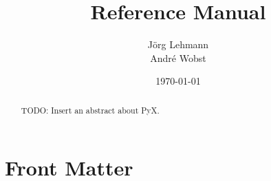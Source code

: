 \documentclass{manual}
\title{\PyX{} Reference Manual}
\author{J\"org Lehmann\\
Andr\'e Wobst}
\date{\today}
\def\PyX{PyX}
\begin{document}
\maketitle

\ifhtml %
\chapter*{Front Matter\label{front}}
\fi
\begin{abstract}
\noindent
TODO: Insert an abstract about \PyX{}.
\end{abstract}

\tableofcontents














%
%
%
%
%


\end{document}
